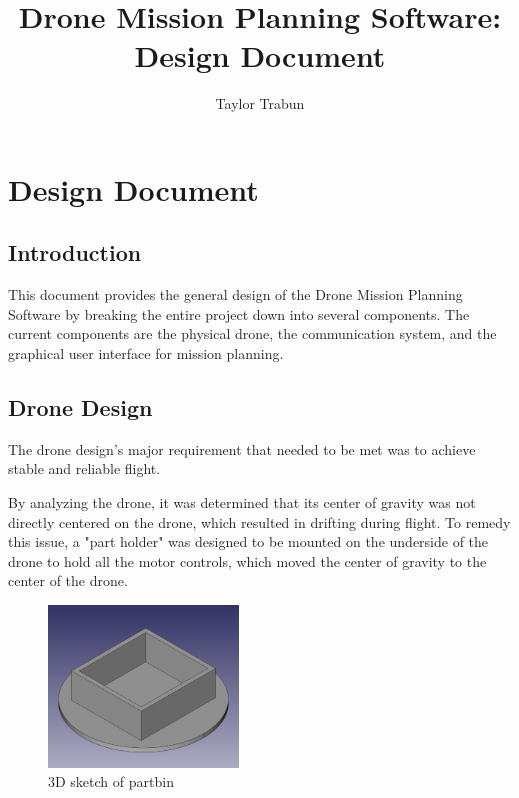 

\author{Taylor Trabun}
\title{Drone Mission Planning Software: Design Document}
%
\maketitle
\section{Design Document}

\subsection{Introduction}
This document provides the general design of the Drone Mission Planning Software by breaking the entire project down into several components. The current components are the physical drone, the communication system, and the graphical user interface for mission planning.

\subsection{Drone Design}
The drone design's major requirement that needed to be met was to achieve stable and reliable flight. 

By analyzing the drone, it was determined that its center of gravity was not directly centered on the drone, which resulted in drifting during flight. To remedy this issue, a "part holder" was designed to be mounted on the underside of the drone to hold all the motor controls, which moved the center of gravity to the center of the drone. 

\begin{figure}[h!]

  \centering
    \includegraphics[width=0.45\textwidth]{./graphics/partbin.jpg}
   \caption{3D sketch of partbin}
\end{figure}


